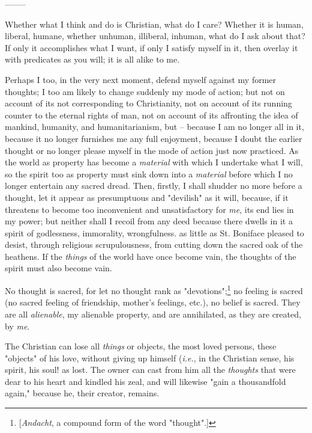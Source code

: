 \begin{center}
--------\end{center}


Whether what I think and do is Christian, what do I care? Whether it is human, 
liberal, humane, whether unhuman, illiberal, inhuman, what do I ask about 
that? If only it accomplishes what I want, if only I satisfy myself in it, 
then overlay it with predicates as you will; it is all alike to me.

Perhaps I too, in the very next moment, defend myself against my former 
thoughts; I too am likely to change suddenly my mode of action; but not on 
account of its not corresponding to Christianity, not on account of its 
running counter to the eternal rights of man, not on account of its affronting 
the idea of mankind, humanity, and humanitarianism, but -- because I am no 
longer all in it, because it no longer furnishes me any full enjoyment, 
because I doubt the earlier thought or no longer please myself in the mode of 
action just now practiced. As the world as property has become a 
\textit{material} with which I undertake what I will, so the spirit too as 
property must sink down into a \textit{material} before which I no longer 
entertain any sacred dread. Then, firstly, I shall shudder no more before a 
thought, let it appear as presumptuous and "{}devilish"{} as it will, because, 
if it threatens to become too inconvenient and unsatisfactory for \textit{me}, 
its end lies in my power; but neither shall I recoil from any deed because 
there dwells in it a spirit of godlessness, immorality, wrongfulness. as 
little as St. Boniface pleased to desist, through religious scrupulousness, 
from cutting down the sacred oak of the heathens. If the \textit{things} of 
the world have once become vain, the thoughts of the spirit must also become 
vain.

No thought is sacred, for let no thought rank as 
"{}devotions"{};\footnote{[\textit{Andacht}, a compound form of the word 
"{}thought"{}.]} no feeling is sacred (no sacred feeling of friendship, 
mother's feelings, etc.), no belief is sacred. They are all 
\textit{alienable}, my alienable property, and are annihilated, as they are 
created, by \textit{me}.

The Christian can lose all \textit{things} or objects, the most loved persons, 
these "{}objects"{} of his love, without giving up himself (\textit{i.e.}, in 
the Christian sense, his spirit, his soul! as lost. The owner can cast from 
him all the \textit{thoughts} that were dear to his heart and kindled his 
zeal, and will likewise "{}gain a thousandfold again,"{} because he, their 
creator, remains.

